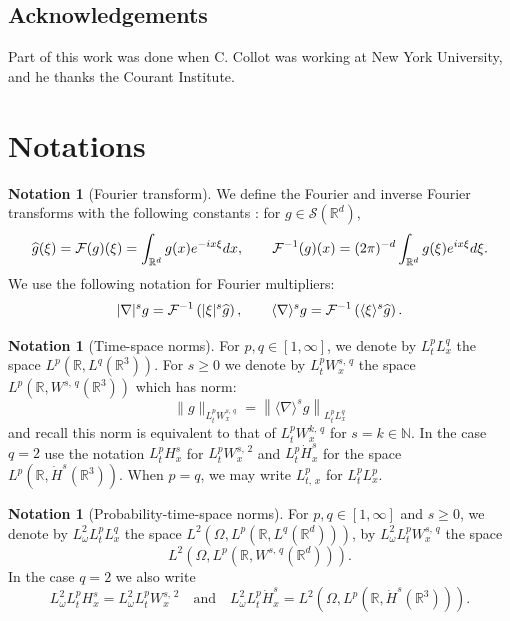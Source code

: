 \documentclass[10pt]{amsart}
\theoremstyle{definition}\newtheorem{defi}[theo]{Definition}\newtheorem{rema}[theo]{Remark}\newtheorem{exam}[theo]{Example}\newtheorem{exem}[theo]{Example}\newtheorem{nota}[theo]{Notation}
\newcommand{\R}{\mathbb{R}}
\newcommand{\N}{\mathbb{N}}
\newcommand{\mclS}{\mathcal{S}}
\newcommand{\mclF}{\mathcal{F}}
\let\oldhat\hat
\renewcommand*{\hat}[1]{\mathchoice{\widehat{#1}}{\widehat{#1}}{\oldhat{#1}}{\oldhat{#1}}}
\begin{document}
\subsection*{Acknowledgements}
Part of this work was done when C. Collot was working at New York University, and he thanks the Courant Institute.


\section{Notations}\label{sec:notations}


\begin{nota}[Fourier transform]
We define the Fourier and inverse Fourier transforms with the following constants : for $g \in \mclS(\R^d)$,
\[
\hat g (\xi) = \mclF (g) (\xi) = \int_{\R^d} g(x) e^{-ix\xi}dx, \qquad \mclF^{-1} (g) (x) = (2\pi)^{-d}\int_{\R^d} g(\xi) e^{ix\xi}d\xi.
\]
We use the following notation for Fourier multipliers:
\[
|\nabla |^s g=\mclF^{-1}\left(|\xi|^s \hat g\right),\qquad \langle \nabla \rangle^s g=\mclF^{-1}\left(\langle \xi \rangle^s \hat g\right).
\]
\end{nota}

\begin{nota}[Time-space norms]
For $p,q\in [1,\infty]$, we denote by $L^p_tL^q_x$ the space $L^p(\R,L^q(\R^3))$. For $s\geq 0$ we denote by $L^p_tW^{s,\,q}_x$ the space $ L^p(\R,W^{s,\,q}(\R^3))$ which has norm:
\[
\| g \|_{L^p_tW^{s,\,q}_x}=\left\| \langle \nabla \rangle^s g \right\|_{L^p_tL^q_x}
\]
and recall this norm is equivalent to that of $L^p_tW^{k,\,q}_x$ for $s=k\in \N$. In the case $q=2$ use the notation $L^p_tH^s_x$ for $L^p_tW^{s,\,2}_x$ and $L^p_t \dot H^s_x$ for the space $L^p(\R, \dot H^s(\R^3))$. When $p=q$, we may write $L^p_{t,\,x}$ for $L^p_tL^p_x$.
\end{nota}

\begin{nota}[Probability-time-space norms]
For $p,q\in [1,\infty]$ and $s\geq 0$, we denote by $L^2_\omega L^p_t L^q_x$ the space $L^2(\Omega,L^p(\R,L^q(\R^d)))$, by $L^2_\omega L^p_t W^{s,\,q}_x$ the space
\[
L^2\left(\Omega,L^p\left(\R,W^{s,\,q}\left(\R^d\right)\right)\right).
\]
In the case $q=2$ we also write
\[
L^2_\omega L^p_t H^s_x=L^2_\omega L^p_tW^{s,\,2}_x\quad\text{and}\quad L^2_\omega L^p_t \dot H^s_x =L^2\left(\Omega,L^p\left(\R, \dot H^s\left(\R^3\right)\right)\right).
\]
\end{nota}
\end{document}
